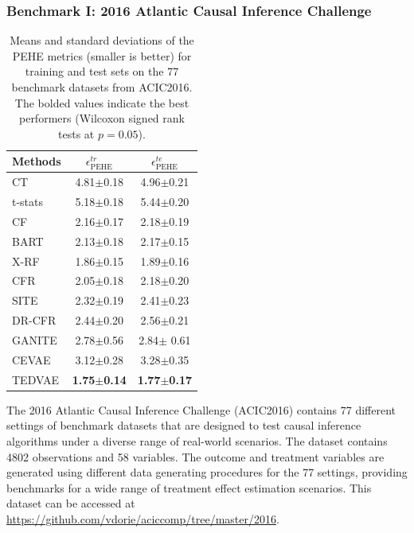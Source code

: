 \documentclass[letterpaper]{article} %
\begin{document}
\subsubsection{Benchmark I: 2016 Atlantic Causal Inference Challenge}


\begin{table}[!t]
	\centering
	\begin{tabular}{l | c c }
		\hline
		Methods & $\epsilon_{\text{PEHE}}^{tr}$ & $\epsilon_{\text{PEHE}}^{te}$ \\
		\hline
		CT &  4.81$\pm$0.18 & 4.96$\pm$0.21 \\
		t-stats &  5.18$\pm$0.18 & 5.44$\pm$0.20 \\
		\hline
		CF	& 2.16$\pm$0.17 & 2.18$\pm$0.19 \\
		BART & 2.13$\pm$0.18 & 2.17$\pm$0.15 \\
		X-RF & 1.86$\pm$0.15 & 1.89$\pm$0.16   \\
		\hline
		CFR	 & 2.05$\pm$0.18 & 2.18$\pm$0.20 \\
		SITE & 2.32$\pm$0.19 & 2.41$\pm$0.23  \\
		DR-CFR & 2.44$\pm$0.20& 2.56$\pm$0.21 \\
		\hline
		GANITE & 2.78$\pm$0.56 & 2.84$\pm$ 0.61 \\
		CEVAE & 3.12$\pm$0.28 & 3.28$\pm$0.35 \\
		TEDVAE & \textbf{1.75$\pm$0.14} &  \textbf{1.77$\pm$0.17}  \\
		\hline
	\end{tabular}
	\caption{Means and standard deviations of the PEHE metrics (smaller is better) for training and test sets on the 77 benchmark datasets from ACIC2016. The bolded values indicate the best performers (Wilcoxon signed rank tests at $p=0.05$).}
	\label{acic2016}
\end{table}

The 2016 Atlantic Causal Inference Challenge (ACIC2016) \cite{Dorie2019} contains 77 different settings of benchmark datasets that are designed to test causal inference algorithms under a diverse range of real-world scenarios.
The dataset contains 4802 observations and 58 variables. The outcome and treatment variables are generated using different data generating procedures for the 77 settings, providing benchmarks for a wide range of treatment effect estimation scenarios. This dataset can be accessed at \url{https://github.com/vdorie/aciccomp/tree/master/2016}.
\end{document}
